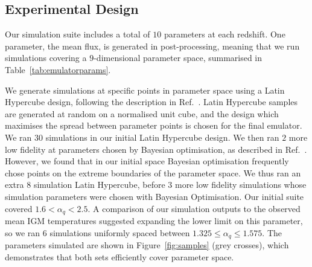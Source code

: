 \documentclass[a4paper,11pt]{article}
\begin{document}

\subsection{Experimental Design}
\label{sec:latinhypercube}


Our simulation suite includes a total of $10$ parameters at each redshift. One parameter, the mean flux, is generated in post-processing, meaning that we run simulations covering a $9$-dimensional parameter space, summarised in Table~\ref{tab:emulatorparams}.

We generate simulations at specific points in parameter space using a Latin Hypercube design, following the description in Ref.~\cite{Bird:2019}. Latin Hypercube samples are generated at random on a normalised unit cube, and the design which maximises the spread between parameter points is chosen for the final emulator. We ran $30$ simulations in our initial Latin Hypercube design. We then ran $2$ more low fidelity at parameters chosen by Bayesian optimisation, as described in Ref.~\cite{Rogers:2019}.
However, we found that in our initial space Bayesian optimisation frequently chose points on the extreme boundaries of the parameter space.
We thus ran an extra $8$ simulation Latin Hypercube, before $3$ more low fidelity simulations whose simulation parameters were chosen with Bayesian Optimisation. Our initial suite covered $1.6 < \alpha_q < 2.5$. A comparison of our simulation outputs to the observed mean IGM temperatures suggested expanding the lower limit on this parameter, so we ran $6$ simulations uniformly spaced between $1.325 \leq \alpha_q \leq 1.575$. The parameters simulated are shown in Figure~\ref{fig:samples} (grey crosses), which demonstrates that both sets efficiently cover parameter space.
\end{document}
